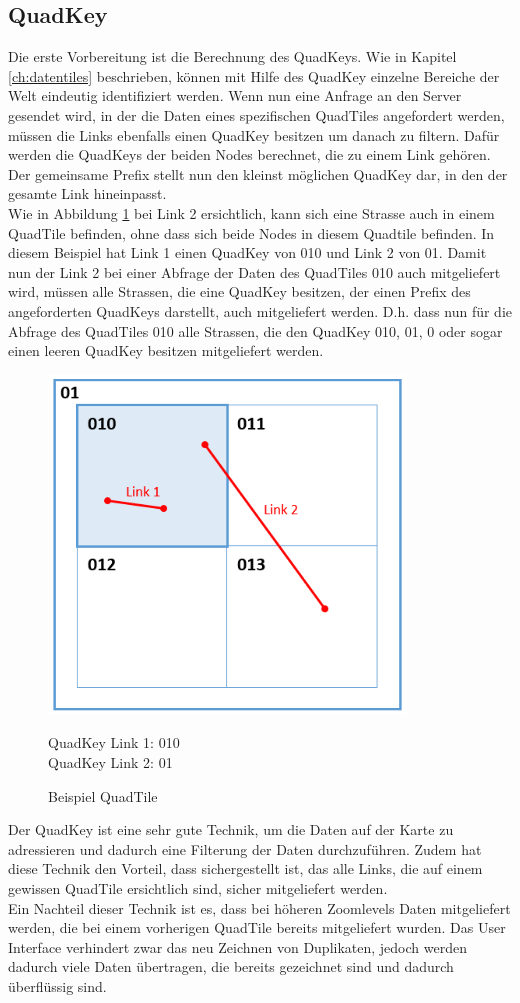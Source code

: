 \subsection{QuadKey}
Die erste Vorbereitung ist die Berechnung des QuadKeys. Wie in Kapitel \ref{ch:datentiles}  beschrieben, können mit Hilfe des QuadKey einzelne Bereiche der Welt eindeutig identifiziert werden. Wenn nun eine Anfrage an den Server gesendet wird, in der die Daten eines spezifischen QuadTiles angefordert werden, müssen die Links ebenfalls einen QuadKey besitzen um danach zu filtern. Dafür werden die QuadKeys der beiden Nodes berechnet, die zu einem Link gehören. Der gemeinsame Prefix stellt nun den kleinst möglichen QuadKey dar, in den der gesamte Link hineinpasst.\\
Wie in Abbildung \ref{pic:example_quadtile} bei Link 2 ersichtlich, kann sich eine Strasse auch in einem QuadTile befinden, ohne dass sich beide Nodes in diesem Quadtile befinden. In diesem Beispiel hat Link 1 einen QuadKey von 010 und Link 2 von 01. Damit nun der Link 2 bei einer Abfrage der Daten des QuadTiles 010 auch mitgeliefert wird, müssen alle Strassen, die eine QuadKey besitzen, der einen Prefix des angeforderten QuadKeys darstellt, auch mitgeliefert werden. D.h. dass nun für die Abfrage des QuadTiles 010 alle Strassen, die den QuadKey 010, 01, 0 oder sogar einen leeren QuadKey \glqq{}\grqq{} besitzen mitgeliefert werden.
\begin{figure}[H]
\centering
\includegraphics[height=9cm]{images/QuadTile_example.PNG}
\caption{Beispiel QuadTile}
QuadKey Link 1: 010\\QuadKey Link 2: 01
\label{pic:example_quadtile}
\end{figure}
\noindent
Der QuadKey ist eine sehr gute Technik, um die Daten auf der Karte zu adressieren und dadurch eine Filterung der Daten durchzuführen. Zudem hat diese Technik den Vorteil, dass sichergestellt ist, das alle Links, die auf einem gewissen QuadTile ersichtlich sind, sicher mitgeliefert werden.\\
Ein Nachteil dieser Technik ist es, dass bei höheren Zoomlevels Daten mitgeliefert werden, die bei einem vorherigen QuadTile bereits mitgeliefert wurden. Das User Interface verhindert zwar das neu Zeichnen von Duplikaten, jedoch werden dadurch viele Daten übertragen, die bereits gezeichnet sind und dadurch überflüssig sind.
\newpage
